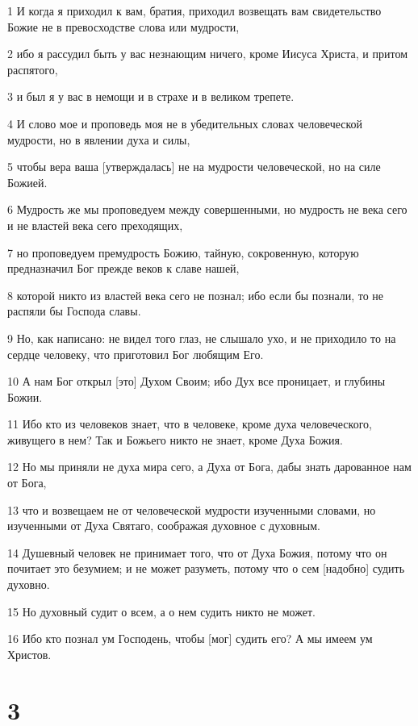 \par 1 И когда я приходил к вам, братия, приходил возвещать вам свидетельство Божие не в превосходстве слова или мудрости,
\par 2 ибо я рассудил быть у вас незнающим ничего, кроме Иисуса Христа, и притом распятого,
\par 3 и был я у вас в немощи и в страхе и в великом трепете.
\par 4 И слово мое и проповедь моя не в убедительных словах человеческой мудрости, но в явлении духа и силы,
\par 5 чтобы вера ваша [утверждалась] не на мудрости человеческой, но на силе Божией.
\par 6 Мудрость же мы проповедуем между совершенными, но мудрость не века сего и не властей века сего преходящих,
\par 7 но проповедуем премудрость Божию, тайную, сокровенную, которую предназначил Бог прежде веков к славе нашей,
\par 8 которой никто из властей века сего не познал; ибо если бы познали, то не распяли бы Господа славы.
\par 9 Но, как написано: не видел того глаз, не слышало ухо, и не приходило то на сердце человеку, что приготовил Бог любящим Его.
\par 10 А нам Бог открыл [это] Духом Своим; ибо Дух все проницает, и глубины Божии.
\par 11 Ибо кто из человеков знает, что в человеке, кроме духа человеческого, живущего в нем? Так и Божьего никто не знает, кроме Духа Божия.
\par 12 Но мы приняли не духа мира сего, а Духа от Бога, дабы знать дарованное нам от Бога,
\par 13 что и возвещаем не от человеческой мудрости изученными словами, но изученными от Духа Святаго, соображая духовное с духовным.
\par 14 Душевный человек не принимает того, что от Духа Божия, потому что он почитает это безумием; и не может разуметь, потому что о сем [надобно] судить духовно.
\par 15 Но духовный судит о всем, а о нем судить никто не может.
\par 16 Ибо кто познал ум Господень, чтобы [мог] судить его? А мы имеем ум Христов.

\chapter{3}

